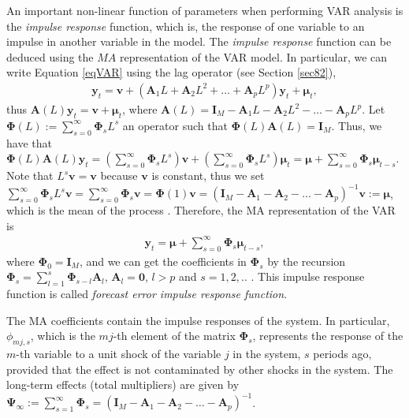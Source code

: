 An important non-linear function of parameters when performing VAR analysis is the \textit{impulse response} function, which is, the response of one variable to an impulse in another variable in the model. The \textit{impulse response} function can be deduced using the $MA$ representation of the VAR model. In particular, we can write Equation \ref{eqVAR} using the lag operator (see Section \ref{sec82}),
\begin{align}\label{eqVAR1}
	\bm{y}_t=\bm{v} + (\bm{A}_{1}L+\bm{A}_{2}L^2+\dots+\bm{A}_{p}L^p)\bm{y}_t+\bm{\mu}_t,
\end{align}
thus $\bm{A}(L)\bm{y}_t=\bm{v}+\bm{\mu}_t$, where $\bm{A}(L)=\bm{I}_M-\bm{A}_{1}L-\bm{A}_{2}L^2-\dots-\bm{A}_{p}L^p$. Let $\bm{\Phi}(L):= \sum_{s=0}^{\infty}\bm{\Phi}_sL^s$ an operator such that $\bm{\Phi}(L)\bm{A}(L)=\bm{I}_M$. Thus, we have that  $\bm{\Phi}(L)\bm{A}(L)\bm{y}_t=\left(\sum_{s=0}^{\infty}\bm{\Phi}_sL^s\right)\bm{v}+\left(\sum_{s=0}^{\infty}\bm{\Phi}_sL^s\right)\bm{\mu}_{t}=\bm{\mu}+\sum_{s=0}^{\infty}\bm{\Phi}_s\bm{\mu}_{t-s}$. Note that $L^s\bm{v}=\bm{v}$ because $\bm{v}$ is constant, thus we set $\sum_{s=0}^{\infty}\bm{\Phi}_sL^s\bm{v}=\sum_{s=0}^{\infty}\bm{\Phi}_s\bm{v}=\bm{\Phi}(1)\bm{v}=(\bm{I}_M-\bm{A}_{1}-\bm{A}_{2}-\dots-\bm{A}_{p})^{-1}\bm{v}:=\bm{\mu}$, which is the mean of the process \cite[Chap.~2]{helmut2005new}. Therefore, the MA representation of the VAR is
\begin{align}\label{eqMA}
	\bm{y}_t=\bm{\mu} + \sum_{s=0}^{\infty}\bm{\Phi}_s\bm{\mu}_{t-s},
\end{align}
where $\bm{\Phi}_0=\bm{I}_M$, and we can get the coefficients in $\bm{\Phi}_s$ by the recursion $\bm{\Phi}_s=\sum_{l=1}^s\bm{\Phi}_{s-l}\bm{A}_l$, $\bm{A}_l=\bm{0}$, $l>p$ and $s=1,2,..$ \cite[Chap.~2]{helmut2005new}. This impulse response function is called \textit{forecast error impulse response function}.

The MA coefficients contain the impulse responses of the system. In particular, $\phi_{mj,s}$, which is the $mj$-th element of the matrix $\bm{\Phi}_s$, represents the response of the $m$-th variable to a unit shock of the variable $j$ in the system, $s$ periods ago, provided that the effect is not contaminated by other shocks in the system. The long-term effects (total multipliers) are given by $\bm{\Psi}_{\infty}:=\sum_{s=1}^{\infty}\bm{\Phi}_s=(\bm{I}_M-\bm{A}_{1}-\bm{A}_{2}-\dots-\bm{A}_{p})^{-1}$.

